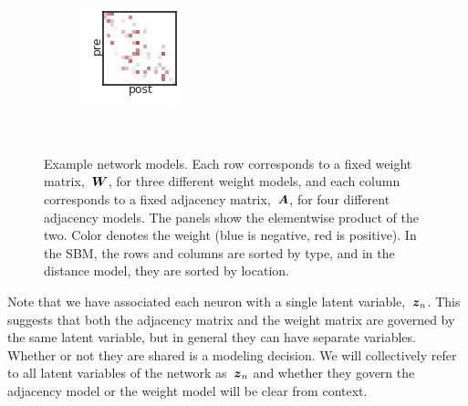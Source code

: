\begin{figure}[t!]
\begin{subfigure}[b]{1.10in}
  \end{subfigure}
  ~
  \hspace{-.1in}
  \begin{subfigure}[b]{1.10in}
    \centering
    \includegraphics[width=\textwidth]{figures/ch3/Distance-Distance.png}
  \end{subfigure}
  \\
  \vspace{-.1in}
  \caption[Examples of network models]{Example network models.  Each
    row corresponds to a fixed weight matrix,~$\boldsymbol{W}$, for three
    different weight models, and each column corresponds to a fixed
    adjacency matrix,~$\boldsymbol{A}$, for four different adjacency models. The
    panels show the elementwise product of the two. Color denotes the
    weight (blue is negative, red is positive).  In the SBM, the rows
    and columns are sorted by type, and in the distance model, they
    are sorted by location. }
  \label{fig:network_models}
\end{figure}

Note that we have associated each neuron with a single latent variable,~$\boldsymbol{z}_n$.
This suggests that both the adjacency matrix and the weight matrix are
governed by the same latent variable, but in general they can have separate
variables. Whether or not they are shared is a modeling decision. We will
collectively refer to all latent variables of the network as~$\boldsymbol{z}_n$ and
whether they govern the adjacency model or the weight model will be clear
from context.


